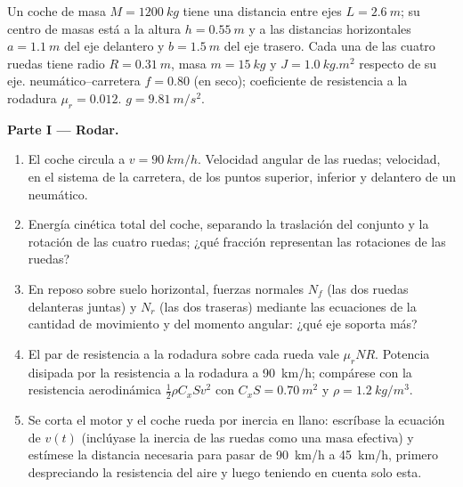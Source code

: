 \begin{problem}
\label{pb:b2:rigid-body-mechanics:1}

Un coche de masa $M = \qty{1200}{kg}$ tiene una distancia entre ejes
$L = \qty{2.6}{m}$; su centro de masas está a la altura $h = \qty{0.55}{m}$
y a las distancias horizontales $a = \qty{1.1}{m}$ del eje delantero y
$b = \qty{1.5}{m}$ del eje trasero. Cada una de las cuatro ruedas tiene
radio $R = \qty{0.31}{m}$, masa $m =
\qty{15}{kg}$ y  $J = \qty{1.0}{kg.m^2}$ respecto de su eje. 
neumático--carretera $f = 0.80$ (en seco); coeficiente de resistencia a la
rodadura $\mu_r = 0.012$. $g = \qty{9.81}{m/s^2}$.

\medskip
\noindent\textbf{Parte I --- Rodar.}
\begin{enumerate}
  \item El coche circula a $v = \qty{90}{km/h}$. Velocidad angular de las
        ruedas; velocidad, en el sistema de la carretera, de los puntos
        superior, inferior y delantero de un neumático.
  \item Energía cinética total del coche, separando la traslación del
        conjunto y la rotación de las cuatro ruedas; ¿qué fracción
        representan las rotaciones de las ruedas?
  \item En reposo sobre suelo horizontal, fuerzas normales $N_f$ (las dos
        ruedas delanteras juntas) y $N_r$ (las dos traseras) mediante las
        ecuaciones de la cantidad de movimiento y del momento angular:
        ¿qué eje soporta más?
  \item El par de resistencia a la rodadura sobre cada rueda vale
        $\mu_rNR$. Potencia disipada por la resistencia a la rodadura a
        \qty{90}{km/h}; compárese con la resistencia aerodinámica
        $\tfrac12\rho C_xSv^2$ con $C_xS =
        \qty{0.70}{m^2}$ y $\rho = \qty{1.2}{kg/m^3}$.
  \item Se corta el motor y el coche rueda por inercia en llano:
        escríbase la ecuación de $v(t)$ (inclúyase la inercia de las
        ruedas como una masa efectiva) y estímese la distancia necesaria
        para pasar de \qty{90}{km/h} a \qty{45}{km/h}, primero
        despreciando la resistencia del aire y luego teniendo en cuenta
        solo esta.
\end{enumerate}


\end{problem}
